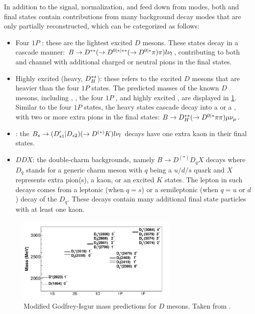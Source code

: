 In addition to the signal, normalization, and feed down from \Dstar modes,
both \Dstarp\mun and \Dz\mun final states contain contributions from many
background decay modes that are only partially reconstructed,
which can be categorized as follows:
\begin{itemize}
    \item Four $1P$ \Dstst:
        these are the lightest excited $D$ mesons.
        These \Dstst states decay in a cascade manner:
        $B \rightarrow D^{**}
        (\rightarrow D^{0|*|**} (\rightarrow D^{0|*}\pi) \pi)
        l{{\nu}_l}$,
        contributing to both \Dz and \Dstar channel with additional
        charged or neutral pions in the final states.
    \item Highly excited \Dstst (\Dstst heavy, $D^{**}_H$):
        these refers to the excited $D$ mesons that are heavier than the four
        $1P$ \Dstst states.
        The predicted masses of
        the known $D$ mesons, including \Dz, \Dstar, the four $1P$ \Dstst,
        and highly excited \Dstst,
        are displayed in \cref{fig:excited-d-meson}.
        Similar to the four $1P$ \Dstst states,
        the \Dstst heavy states cascade decay into a \Dz or a \Dstar,
        with two or more extra pions in the final states:
        $B \rightarrow D^{**}_H (\rightarrow D^{0|*} \pi\pi) \mu{\ensuremath{{\nu}_\mu}}$.
    \item \DststS:
        the $B_s \rightarrow (D'_{s1}|D_{s2})
        (\rightarrow D^{(*)}K) l{{\nu}_l}$
        decays have one extra kaon in their final states.
    \item $DDX$:
        the double-charm backgrounds,
        namely $B \rightarrow D^{(*)} D_q X$ decays
        where $D_q$ stands for a generic charm meson with $q$ being a
        $u/d/s$ quark and $X$ represents extra pion(s), a kaon, or an
        excited $K$ states.
        The lepton in such decays comes from
        a leptonic (when $q = s$) or a semileptonic
        (when $q = u \text{ or } d$) decay of the $D_q$.
        These decays contain many additional final state particles with at least
        one kaon.
\end{itemize}

\begin{figure}[!htb]
    \centering
    \includegraphics[width=0.7\textwidth]{figs-analysis-overview/d_meson_predicted_masses.pdf}
    \caption{
        Modified Godfrey-Isgur mass predictions for $D$ mesons.
        Taken from \cite{D_mesons_2013}.
    }
    \label{fig:excited-d-meson}
\end{figure}

